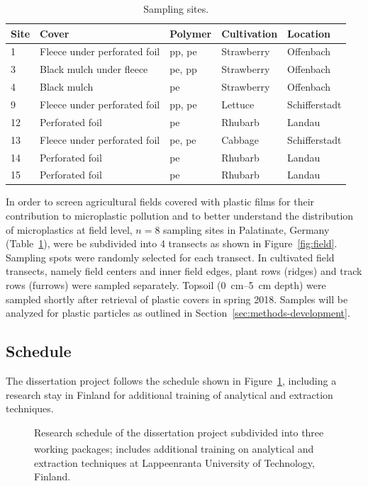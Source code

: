 \documentclass[justified,a4paper,
	nofonts,
	nobib
]{tufte-handout}
\begin{document}
\begin{table}[b]
	\centering\footnotesize
	\caption{Sampling sites.}\label{tab:sites}
	\begin{tabular}{lllll}
		\toprule
		Site & Cover & Polymer & Cultivation & Location \\
		\midrule
		1 & Fleece under perforated foil & \acs{pp}, \acs{pe} & Strawberry & Offenbach \\
		3 & Black mulch under fleece & \acs{pe}, \acs{pp} & Strawberry & Offenbach \\
		4 & Black mulch & \acs{pe} & Strawberry & Offenbach \\
		9 & Fleece under perforated foil & \acs{pp}, \acs{pe} & Lettuce & Schifferstadt \\
		12 & Perforated foil & \acs{pe} & Rhubarb & Landau  \\
		13 & Fleece under perforated foil & \acs{pe}, \acs{pe} & Cabbage & Schifferstadt \\
		14 & Perforated foil & \acs{pe} & Rhubarb & Landau \\
		15 & Perforated foil & \acs{pe} & Rhubarb & Landau \\
		\bottomrule
	\end{tabular}
\end{table}

In order to screen agricultural fields covered with plastic films for their contribution to microplastic pollution and to better understand the distribution of microplastics at field level, $n = 8$ sampling sites in Palatinate, Germany (Table~\ref{tab:sites}), were be subdivided into \num{4} transects as shown in Figure~\ref{fig:field}. Sampling spots were randomly selected for each transect. In cultivated field transects, namely field centers and inner field edges, plant rows (ridges) and track rows (furrows) were sampled separately. Topsoil (\SIrange{0}{5}{\centi\meter} depth) were sampled shortly after retrieval of plastic covers in spring 2018. Samples will be analyzed for plastic particles as outlined in Section~\ref{sec:methods-development}.

\subsection{Schedule}

The dissertation project follows the schedule shown in Figure~\ref{fig:ganttchart}, including a research stay in Finland for additional training of analytical and extraction techniques.

\begin{figure}
	
	\caption{Research schedule of the dissertation project subdivided into three working packages; \textsuperscript{\textdagger}includes additional training on analytical and extraction techniques at Lappeenranta University of Technology, Finland.}
	\label{fig:ganttchart}%
\end{figure}
\end{document}
